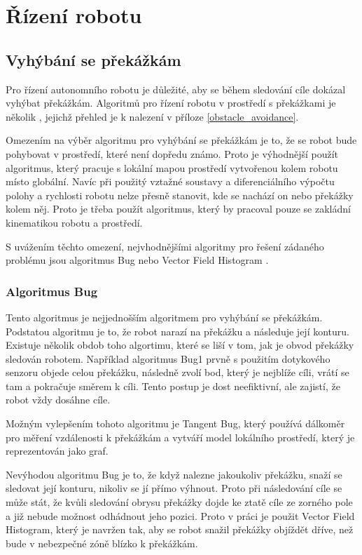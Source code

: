 \documentclass[twoside]{ctuthesis}
\theoremstyle{plain}
\theoremstyle{definition}
\theoremstyle{note}
\begin{document}
\chapter{Řízení robotu}

\section{Vyhýbání se překážkám}

Pro řízení autonomního robotu je důležité, aby se během sledování cíle dokázal vyhýbat překážkám. Algoritmů pro řízení robotu v prostředí s překážkami je několik \cite{cite:20}, jejichž přehled je k nalezení v příloze \ref{obstacle_avoidance}.

Omezením na výběr algoritmu pro vyhýbání se překážkám je to, že se robot bude pohybovat v prostředí, které není dopředu známo. Proto je výhodnější použít algoritmus, který pracuje s lokální mapou prostředí vytvořenou kolem robotu místo globální. Navíc při použitý vztažné soustavy a diferenciálního výpočtu polohy a rychlosti robotu nelze přesně stanovit, kde se nachází on nebo překážky kolem něj. Proto je třeba použít algoritmus, který by pracoval pouze se zakládní kinematikou robotu a prostředí.

S uvážením těchto omezení, nejvhodnějšími algoritmy pro řešení zádaného problému jsou algoritmus Bug \cite[s. 272--276]{cite:20} nebo Vector Field Histogram \cite[s. 276--278]{cite:20}\cite{cite:12}.

\subsection{Algoritmus Bug}

Tento algoritmus je nejjednošším algoritmem pro vyhýbání se překážkám. Podstatou algoritmu je to, že robot narazí na překážku a následuje její konturu. Existuje několik obdob toho algortimu, které se liší v tom, jak je obvod překážky sledován robotem. Například algoritmus Bug1 prvně s použitím dotykového senzoru objede celou překážku, následně zvolí bod, který je nejblíže cíli, vrátí se tam a pokračuje směrem k cíli. Tento postup je dost neefiktivní, ale zajistí, že robot vždy dosáhne cíle.

Možným vylepšením tohoto algoritmu je Tangent Bug, který používá dálkoměr pro měření vzdálenosti k překážkám a vytváří model lokálního prostředí, který je reprezentován jako graf. 

Nevýhodou algoritmu Bug je to, že když nalezne jakoukoliv překážku, snaží se sledovat její konturu, nikoliv se jí přímo výhnout. Proto při následování cíle se může stát, že kvůli sledování obrysu překážky dojde ke ztatě cíle ze zorného pole a již nebude možnost odhádnout jeho pozici. Proto v práci je použit Vector Field Histogram, který je navržen tak, aby se robot snažil překážky objíždět dříve, než bude v nebezpečné zóně blízko k překážkám. 
\end{document}
